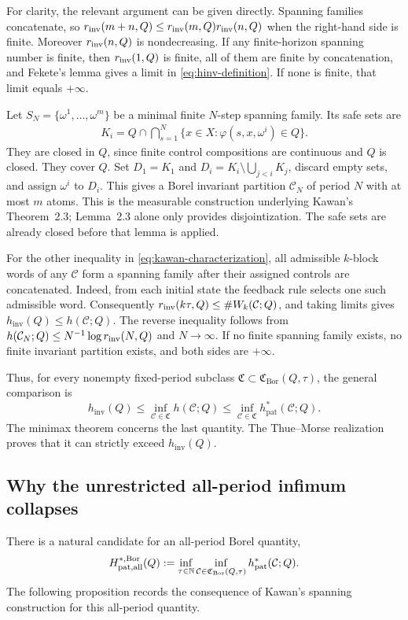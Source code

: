 \documentclass[11pt,reqno]{amsart}
\numberwithin{equation}{section}
\theoremstyle{definition}
\newcommand{\N}{\mathbb N}
\newcommand{\C}{\mathcal C}
\newcommand{\hpat}{h_{\mathrm{pat}}^{*}}
\newcommand{\hinv}{h_{\mathrm{inv}}}
\newcommand{\Bor}{\mathrm{Bor}}
\begin{document}
For clarity, the relevant argument can be given directly. Spanning
families concatenate, so
$r_{\rm inv}(m+n,Q)\le r_{\rm inv}(m,Q)r_{\rm inv}(n,Q)$ when the
right-hand side is finite. Moreover $r_{\rm inv}(n,Q)$ is nondecreasing.
If any finite-horizon spanning number is finite, then $r_{\rm inv}(1,Q)$
is finite, all of them are finite by concatenation, and Fekete's lemma
gives a limit in \eqref{eq:hinv-definition}. If none is finite, that
limit equals $+\infty$.

Let $S_N=\{\omega^1,\ldots,\omega^m\}$ be a minimal finite
$N$-step spanning family. Its safe sets are
\begin{align*}
 K_i=Q\cap\bigcap_{s=1}^{N}
       \{x\in X:\varphi(s,x,\omega^i)\in Q\}.
\end{align*}
They are closed in $Q$, since finite control compositions are continuous
and $Q$ is closed. They cover $Q$. Set
$D_1=K_1$ and $D_i=K_i\setminus\bigcup_{j<i}K_j$, discard empty sets,
and assign $\omega^i$ to $D_i$. This gives a Borel invariant partition
$\C_N$ of period $N$ with at most $m$ atoms. This is the measurable
construction underlying Kawan's Theorem~2.3; Lemma~2.3 alone only
provides disjointization. The safe sets are already closed before
that lemma is applied.

For the other inequality in \eqref{eq:kawan-characterization}, all
admissible $k$-block words of any $\C$ form a spanning family after their
assigned controls are concatenated. Indeed, from each initial state the
feedback rule selects one such admissible word. Consequently
$r_{\rm inv}(k\tau,Q)\le\#W_k(\C;Q)$, and taking limits gives
$\hinv(Q)\le h(\C;Q)$. The reverse inequality follows from
$h(\C_N;Q)\le N^{-1}\log r_{\rm inv}(N,Q)$ and $N\to\infty$.
If no finite spanning family exists, no finite invariant partition exists,
and both sides are $+\infty$.

Thus, for every nonempty fixed-period subclass
$\mathfrak C\subset\mathfrak C_{\Bor}(Q,\tau)$, the general comparison is
\begin{equation}\label{eq:three-quantities}
 \hinv(Q)
 \le\inf_{\C\in\mathfrak C}h(\C;Q)
 \le\inf_{\C\in\mathfrak C}\hpat(\C;Q).
\end{equation}
The minimax theorem concerns the last quantity. The Thue--Morse
realization proves that it can strictly exceed $\hinv(Q)$.

\subsection{Why the unrestricted all-period infimum collapses}
There is a natural candidate for an all-period Borel quantity,
\begin{align*}
 H_{\rm pat,all}^{*,\Bor}(Q)
 :=\inf_{\tau\in\N}\inf_{\C\in\mathfrak C_{\Bor}(Q,\tau)}
       \hpat(\C;Q).
\end{align*}
The following proposition records the consequence of Kawan's spanning
construction for this all-period quantity.
\end{document}
